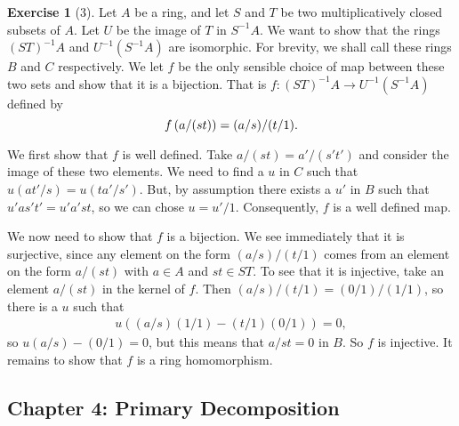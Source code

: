 \documentclass{article}
\theoremstyle{definition}
\newtheorem*{exercise}{Exercise}
\newcommand{\loc}[2]{#1^{-1}#2}
\begin{document}
\begin{exercise}[3]
    Let $A$ be a ring, and let $S$ and $T$ be two multiplicatively closed
    subsets of $A$. Let $U$ be the image of $T$ in $\loc{S}{A}$. We want to
    show that the rings $\loc{(ST)}{A}$ and $\loc{U}{\left( \loc{S}{A}
    \right)}$ are isomorphic. For brevity, we shall call these rings $B$ and
    $C$ respectively. We let $f$ be the only sensible choice of map between
    these two sets and show that it is a bijection. That is $f \colon
    \loc{(ST)}{A} \to \loc{U}{\left( \loc{S}{A} \right)}$ defined by
    \begin{equation}
        \notag
        f\left(a / (st)\right)  = (a / s) / (t / 1).
    \end{equation}

    We first show that $f$ is well defined. Take $a / (st) = a' / (s't')$ and
    consider the image of these two elements. We need to find a $u$ in $C$ such
    that $u \left( at' / s \right) = u \left( ta' / s' \right)$. But, by
    assumption there exists a $u'$ in $B$ such that $u'as't' = u'a'st$, so we
    can chose $u = u' / 1$. Consequently, $f$ is a well defined map.

    We now need to show that $f$ is a bijection. We see immediately that it is
    surjective, since any element on the form $(a / s) / (t / 1)$ comes from an
    element on the form $a / (st)$ with $a \in A$ and $st \in ST$. To see that
    it is injective, take an element $a / (st)$ in the kernel of $f$. Then $(a
    / s)/(t / 1) = (0/1) / (1 / 1)$, so there is a $u$ such that
    \begin{align*}
        u\left((a / s)(1 / 1) -  (t / 1)(0 / 1)\right) = 0,
    \end{align*}
    so $u(a / s) - (0 / 1) = 0$, but this means that $a / st = 0$ in $B$. So
    $f$ is injective. It remains to show that $f$ is a ring homomorphism. 
\end{exercise}

\subsection{Chapter 4: Primary Decomposition}
\label{sub:chapter_4_primary_decomposition}
\end{document}
